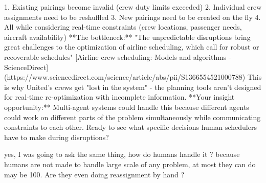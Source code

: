 \begin{botresponse}
1.  Existing pairings become invalid (crew duty limits exceeded)
2.  Individual crew assignments need to be reshuffled
3.  New pairings need to be created on the fly
4.  All while considering real-time constraints (crew locations, passenger needs, aircraft availability)
**The bottleneck:** "The unpredictable disruptions bring great challenges to the optimization of airline scheduling, which call for robust or recoverable schedules" [Airline crew scheduling: Models and algorithms - ScienceDirect](https://www.sciencedirect.com/science/article/abs/pii/S1366554521000788)
This is why United's crews get "lost in the system" - the planning tools aren't designed for real-time re-optimization with incomplete information.
**Your insight opportunity:** Multi-agent systems could handle this because different agents could work on different parts of the problem simultaneously while communicating constraints to each other.
Ready to see what specific decisions human schedulers have to make during disruptions?
\end{botresponse}

\begin{userprompt}
yes, I was going to ask the same thing, how do humans handle it ? because humans are not made to handle large scale of any problem, at most they can do may be 100. Are they even doing reassignment by hand ?
\end{userprompt}

